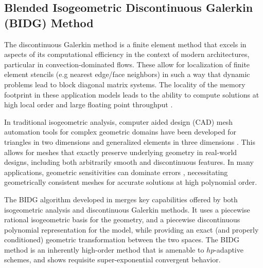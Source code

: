\subsection{Blended Isogeometric Discontinuous Galerkin (BIDG) Method}
\label{sec:isogeometric}

The discontinuous Galerkin method is a finite element method that excels in
aspects of its computational efficiency in the context of modern architectures,
particular in convection-dominated flows.  These allow for localization of
finite element stencils (e.g nearest edge/face neighbors) in such a way that dynamic problems lead to block
diagonal matrix systems.  The locality of the memory footprint in these
application models leads to the ability to compute solutions at high local
order and large floating point throughput \cite{Klockner20097863}.

In traditional isogeometric analysis, computer aided design (CAD) mesh
automation tools for complex geometric domains have been developed for
triangles in two dimensions \cite{Engvall2016378} and generalized elements in
three dimensions \cite{EngvallPress}.  This allows for meshes that exactly
preserve underlying geometry in real-world designs, including both arbitrarily
smooth and discontinuous features.  In many applications, geometric
sensitivities can dominate errors \cite{Michoski2016658,Wirasaet2015597},
necessitating geometrically consistent meshes for accurate solutions at high
polynomial order.

The BIDG algorithm developed in \cite{Michoski2016658} merges key capabilities
offered by both isogeometric analysis and discontinuous Galerkin methods.  It
uses a piecewise rational isogeometric basis for the geometry, and a piecewise
discontinuous polynomial representation for the model, while providing an exact
(and properly conditioned) geometric transformation between the two spaces. The
BIDG method is an inherently high-order method that is amenable to
$hp$-adaptive schemes, and shows requisite super-exponential convergent
behavior.



